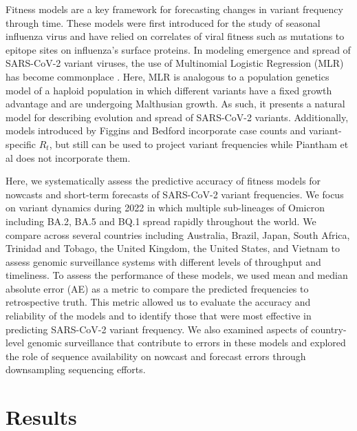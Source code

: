 Fitness models are a key framework for forecasting changes in variant frequency through time.
These models were first introduced for the study of seasonal influenza virus \cite{luksza2014predictive, morris2018predictive, huddleston2020integrating} and have relied on correlates of viral fitness such as mutations to epitope sites on influenza's surface proteins.
In modeling emergence and spread of SARS-CoV-2 variant viruses, the use of Multinomial Logistic Regression (MLR) has become commonplace \cite{Annavajhala2021, faria2021genomics, obermeyer2022analysis, susswein2023early}.
Here, MLR is analogous to a population genetics model of a haploid population in which different variants have a fixed growth advantage and are undergoing Malthusian growth.
As such, it presents a natural model for describing evolution and spread of SARS-CoV-2 variants.
Additionally, models introduced by Figgins and Bedford \cite{Figgins2021} incorporate case counts and variant-specific $R_t$, but still can be used to project variant frequencies while Piantham et al \cite{piantham2021estimating} does not incorporate them.

Here, we systematically assess the predictive accuracy of fitness models for nowcasts and short-term forecasts of SARS-CoV-2 variant frequencies.
We focus on variant dynamics during 2022 in which multiple sub-lineages of Omicron including BA.2, BA.5 and BQ.1 spread rapidly throughout the world.
We compare across several countries including Australia, Brazil, Japan, South Africa, Trinidad and Tobago, the United Kingdom, the United States, and Vietnam to assess genomic surveillance systems with different levels of throughput and timeliness.
To assess the performance of these models, we used mean and median absolute error (AE) as a metric to compare the predicted frequencies to retrospective truth.
This metric allowed us to evaluate the accuracy and reliability of the models and to identify those that were most effective in predicting SARS-CoV-2 variant frequency.
We also examined aspects of country-level genomic surveillance that contribute to errors in these models and explored the role of sequence availability on nowcast and forecast errors through downsampling sequencing efforts.

\section{Results}

